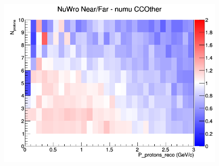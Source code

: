 \begin{figure}[h]
\endminipage
{}
\includegraphics[width=\linewidth]{eff_N_P/LAr/protons/ratios/CCOther_NuWro_numu_NF_N_P.png}
\endminipage
\newline
\end{figure}
\clearpage
